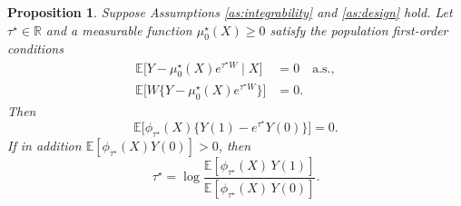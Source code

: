 \documentclass[11pt]{article}
\newtheorem{proposition}[theorem]{Proposition}
\theoremstyle{definition}
\theoremstyle{plain}
\newcommand{\E}{\mathbb{E}}
\newcommand{\1}{\mathbf{1}}
\newcommand{\R}{\mathbb{R}}
\begin{document}
\begin{proposition}
\label{prop:reduction}
Suppose Assumptions \ref{as:integrability} and \ref{as:design} hold. Let $\tau^\star\in\R$ and a measurable function $\mu_0^\star(X)\ge 0$ satisfy the population first-order conditions
\begin{align}
\E\big[Y-\mu_0^\star(X)e^{\tau^\star W}\mid X\big] &= 0 \quad \text{a.s.},
\label{eq:condFOC}
\\
\E\big[W\{Y-\mu_0^\star(X)e^{\tau^\star W}\}\big] &= 0.
\label{eq:treatFOC}
\end{align}
Then
\begin{equation}
\E\Big[\phi_{\tau^\star}(X)\bigl\{Y(1)-e^{\tau^\star}Y(0)\bigr\}\Big]=0.
\label{eq:pseudotrue}
\end{equation}
If in addition $\E[\phi_{\tau^\star}(X)Y(0)]>0$, then
\begin{equation}
\tau^\star=\log\frac{\E[\phi_{\tau^\star}(X)\,Y(1)]}{\E[\phi_{\tau^\star}(X)\,Y(0)]} .
\label{eq:expostratio}
\end{equation}
\end{proposition}
\end{document}
